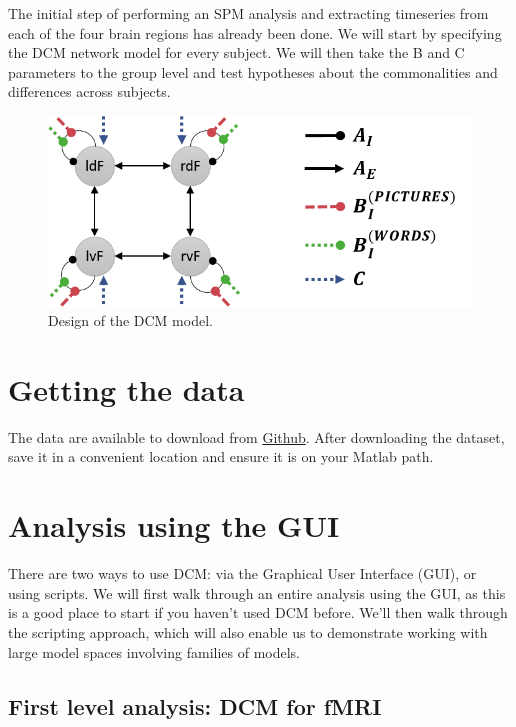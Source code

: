 \documentclass{article}
\begin{document}
The initial step of performing an SPM analysis and extracting timeseries from each of the four brain regions has already been done. We will start by specifying the DCM network model for every subject. We will then take the B and C parameters to the group level and test hypotheses about the commonalities and differences across subjects.

\begin{figure}[ht]
\begin{center}
\includegraphics{"Fig_intro_network"}
\caption{Design of the DCM model.\label{Fig_intro_network}}
\end{center}
\end{figure}

\section{Getting the data}
The data are available to download from \href{https://github.com/pzeidman/dcm-peb-example/}{Github}. After downloading the dataset, save it in a convenient location and ensure it is on your Matlab path. 
\section{Analysis using the GUI}

There are two ways to use DCM: via the Graphical User Interface (GUI), or using scripts. We will first walk through an entire analysis using the GUI, as this is a good place to start if you haven't used DCM before. We'll then walk through the scripting approach, which will also enable us to demonstrate working with large model spaces involving families of models.

\subsection{First level analysis: DCM for fMRI}
\end{document}
